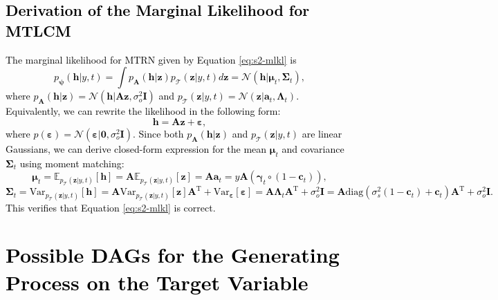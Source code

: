 \documentclass[10pt]{article} %
\theoremstyle{plain}
\theoremstyle{definition}
\begin{document}
\textcolor{black}{
\section{Derivation of the Marginal Likelihood for MTLCM}\label{appendix:derivation-mlkl}
The marginal likelihood for MTRN given by Equation \eqref{eq:s2-mlkl} is
\begin{equation}
    p_{\boldsymbol{\psi}}(\mathbf{h}|y,t)=\int p_{\mathbf{A}}(\mathbf{h}|\mathbf{z})p_{\mathcal{T}}(\mathbf{z}|y,t)d\mathbf{z}
    =\mathcal{N}(\mathbf{h}|\boldsymbol{\mu}_t,\boldsymbol{\Sigma}_t),
\end{equation}
where $p_{\mathbf{A}}(\mathbf{h}|\mathbf{z})=\mathcal{N}(\mathbf{h}|\mathbf{A}\mathbf{z},\sigma_{o}^{2}\mathbf{I})$ and $p_{\mathcal{T}}(\mathbf{z}|y,t)=\mathcal{N}(\mathbf{z}|\mathbf{a}_t,\boldsymbol{\Lambda}_t)$.
Equivalently, we can rewrite the likelihood in the following form:
\begin{equation}
    \mathbf{h} = \mathbf{A}\mathbf{z} + \boldsymbol{\varepsilon},
\end{equation}
where $p(\boldsymbol{\varepsilon})=\mathcal{N}(\boldsymbol{\varepsilon}|\mathbf{0},\sigma_{o}^{2}\mathbf{I})$. Since both $p_{\mathbf{A}}(\mathbf{h}|\mathbf{z})$ and $p_{\mathcal{T}}(\mathbf{z}|y,t)$ are linear Gaussians, we can derive closed-form expression for the mean $\boldsymbol{\mu}_t$ and covariance $\boldsymbol{\Sigma}_t$ using moment matching:
\begin{equation}
    \boldsymbol{\mu}_t=\mathbb{E}_{p_{\mathcal{T}}(\mathbf{z}|y,t)}[\mathbf{h}]=\mathbf{A}\mathbb{E}_{p_{\mathcal{T}}(\mathbf{z}|y,t)}[\mathbf{z}]=\mathbf{A}\mathbf{a}_t=y\mathbf{A}(\boldsymbol{\gamma}_t\circ(1-\mathbf{c}_t)),
\end{equation}
\begin{equation}
    \boldsymbol{\Sigma}_t = \text{Var}_{p_{\mathcal{T}}(\mathbf{z}|y,t)}[\mathbf{h}]=\mathbf{A}\text{Var}_{p_{\mathcal{T}}(\mathbf{z}|y,t)}[\mathbf{z}]\mathbf{A}^{\text{T}} + \text{Var}_{\boldsymbol{\varepsilon}}[\boldsymbol{\varepsilon}]=\mathbf{A}\boldsymbol{\Lambda}_t\mathbf{A}^{\text{T}}+\sigma_{o}^{2}\mathbf{I}=\mathbf{A}\text{diag}(\sigma_{s}^{2}(1-\mathbf{c}_t)+\mathbf{c}_t)\mathbf{A}^{\text{T}}+\sigma_o^2\mathbf{I}.
\end{equation}
This verifies that Equation \eqref{eq:s2-mlkl} is correct.
}


\section{\textcolor{black}{Possible DAGs for the Generating Process on the Target Variable}}\label{appendix: dag-MTLCM}
\end{document}
